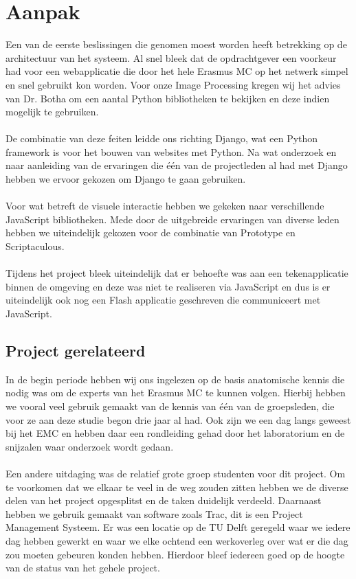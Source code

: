 \chapter{Aanpak}
\label{Aanpak}
Een van de eerste beslissingen die genomen moest worden heeft betrekking op de architectuur van het systeem. 
Al snel bleek dat de opdrachtgever een voorkeur had voor een webapplicatie die door het hele Erasmus MC op het netwerk simpel en snel gebruikt kon worden. 
Voor onze Image Processing kregen wij het advies van Dr. Botha om een aantal Python bibliotheken te bekijken en deze indien mogelijk te gebruiken. 
\\
\\
De combinatie van deze feiten leidde ons richting Django, wat een Python framework is voor het bouwen van websites met Python. 
Na wat onderzoek en naar aanleiding van de ervaringen die \'{e}\'{e}n van de projectleden al had met Django hebben we ervoor gekozen om Django te gaan gebruiken. 
\\
\\
Voor wat betreft de visuele interactie hebben we gekeken naar verschillende JavaScript bibliotheken. Mede door de uitgebreide ervaringen van diverse leden hebben we uiteindelijk gekozen voor de combinatie van Prototype en Scriptaculous.
\\
\\
Tijdens het project bleek uiteindelijk dat er behoefte was aan een tekenapplicatie binnen de omgeving en deze was niet te realiseren via JavaScript en dus is er uiteindelijk ook nog een Flash applicatie geschreven die communiceert met JavaScript.

\section{Project gerelateerd}
\label{aanpak_project_gerelateerd}
In de begin periode hebben wij ons ingelezen op de basis anatomische kennis die nodig was om de experts van het Erasmus MC te kunnen volgen. Hierbij hebben we vooral veel gebruik gemaakt van de kennis van \'{e}\'{e}n van de groepsleden, die voor ze aan deze studie begon drie jaar al had. Ook zijn we een dag langs geweest bij het EMC en hebben daar een rondleiding gehad door het laboratorium en de snijzalen waar onderzoek wordt gedaan. 
\\
\\
Een andere uitdaging was de relatief grote groep studenten voor dit project. 
Om te voorkomen dat we elkaar te veel in de weg zouden zitten hebben we de diverse delen van het project opgesplitst en de taken duidelijk verdeeld. 
Daarnaast hebben we gebruik gemaakt van software zoals Trac, dit is een Project Management Systeem. 
Er was een locatie op de TU Delft geregeld waar we iedere dag hebben gewerkt en waar we elke ochtend een werkoverleg over wat er die dag zou moeten gebeuren konden hebben. 
Hierdoor bleef iedereen goed op de hoogte van de status van het gehele project.


